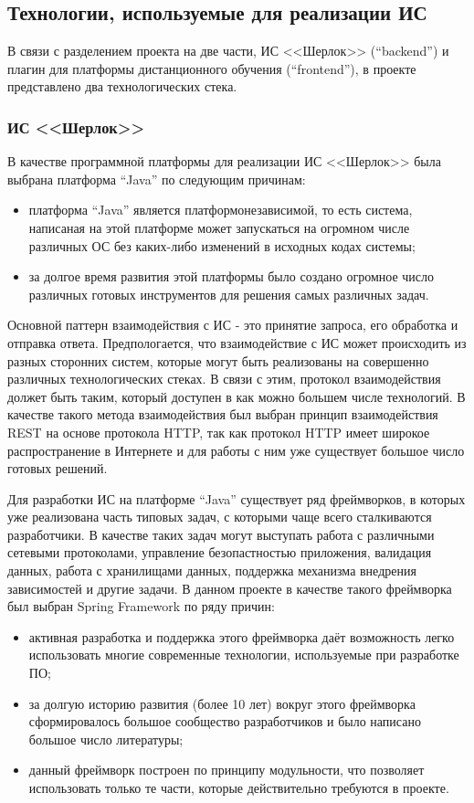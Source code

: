 	\subsection{Технологии, используемые для реализации ИС}

		В связи с разделением проекта на две части, ИС <<Шерлок>> (``backend'') и плагин для платформы дистанционного обучения (``frontend''), в проекте представлено два технологических стека.

		\subsubsection{ИС <<Шерлок>>}

			В качестве программной платформы для реализации ИС <<Шерлок>> была выбрана платформа ``Java'' по следующим причинам:
			\begin{itemize}
				\item платформа ``Java'' является платформонезависимой, то есть система, написаная на этой платформе может запускаться на огромном числе различных ОС без каких-либо изменений в исходных кодах системы;
				\item за долгое время развития этой платформы было создано огромное число различных готовых инструментов для решения самых различных задач.
			\end{itemize}

			Основной паттерн взаимодействия с ИС - это принятие запроса, его обработка и отправка ответа. Предпологается, что взаимодействие с ИС может происходить из разных сторонних систем, которые могут быть реализованы на совершенно различных технологических стеках. В связи с этим, протокол взаимодействия должет быть таким, который доступен в как можно большем числе технологий. В качестве такого метода взаимодействия был выбран принцип взаимодействия REST на основе протокола HTTP, так как протокол HTTP имеет широкое распространение в Интернете и для работы с ним уже существует большое число готовых решений.

			Для разработки ИС на платформе ``Java'' существует ряд фреймворков, в которых уже реализована часть типовых задач, с которыми чаще всего сталкиваются разработчики. В качестве таких задач могут выступать работа с различными сетевыми протоколами, управление безопастностью приложения, валидация данных, работа с хранилищами данных, поддержка механизма внедрения зависимостей и другие задачи. В данном проекте в качестве такого фреймворка был выбран Spring Framework по ряду причин:
			\begin{itemize}
				\item активная разработка и поддержка этого фреймворка даёт возможность легко использовать многие современные технологии, используемые при разработке ПО;
				\item за долгую историю развития (более 10 лет) вокруг этого фреймворка сформировалось большое сообщество разработчиков и было написано большое число литературы;
				\item данный фреймворк построен по принципу модульности, что позволяет использовать только те части, которые действительно требуются в проекте.
			\end{itemize}


